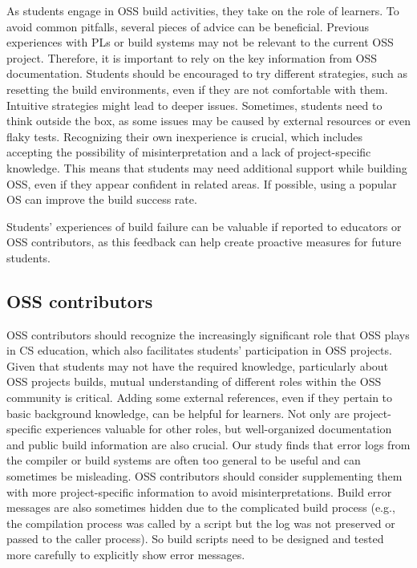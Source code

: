 \documentclass[10pt, conference]{IEEEtran}
\begin{document}
As students engage in OSS build activities, they take on the role of learners. To avoid common pitfalls, several pieces of advice can be beneficial. Previous experiences with PLs or build systems may not be relevant to the current OSS project. Therefore, it is important to rely on the key information from OSS documentation. Students should be encouraged to try different strategies, such as resetting the build environments, even if they are not comfortable with them. Intuitive strategies might lead to deeper issues. Sometimes, students need to think outside the box, as some issues may be caused by external resources or even flaky tests. Recognizing their own inexperience is crucial, which includes accepting the possibility of misinterpretation and a lack of project-specific knowledge. This means that students may need additional support while building OSS, even if they appear confident in related areas. If possible, using a popular OS can improve the build success rate.

Students' experiences of build failure can be valuable if reported to educators or OSS contributors, as this feedback can help create proactive measures for future students.

\subsection{OSS contributors}

OSS contributors should recognize the increasingly significant role that OSS plays in CS education, which also facilitates students' participation in OSS projects. Given that students may not have the required knowledge, particularly about OSS projects builds, mutual understanding of different roles within the OSS community is critical. Adding some external references, even if they pertain to basic background knowledge, can be helpful for learners. Not only are project-specific experiences valuable for other roles, but well-organized documentation and public build information are also crucial. Our study finds that error logs from the compiler or build systems are often too general to be useful and can sometimes be misleading. OSS contributors should consider supplementing them with more project-specific information to avoid misinterpretations. Build error messages are also sometimes hidden due to the complicated build process (e.g., the compilation process was called by a script but the log was not preserved or passed to the caller process). So build scripts need to be designed and tested more carefully to explicitly show error messages.
\end{document}
